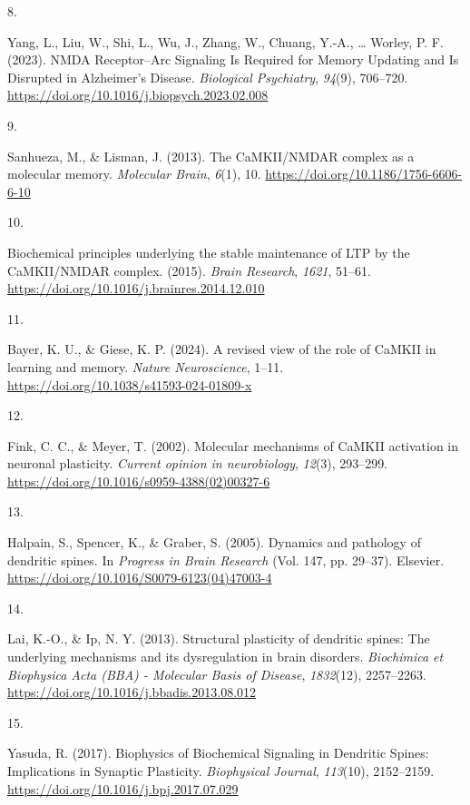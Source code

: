 \documentclass[
  11pt,
  letterpaper,
]{scrreprt}
\newlength{\cslhangindent}
\newlength{\csllabelwidth}
\newenvironment{CSLReferences}[2] %
 {\begin{list}{}{%
  \setlength{\itemindent}{0pt}
  \setlength{\leftmargin}{0pt}
  \setlength{\parsep}{0pt}
  \ifodd #1
   \setlength{\leftmargin}{\cslhangindent}
   \setlength{\itemindent}{-1\cslhangindent}
  \fi
  \setlength{\itemsep}{#2\baselineskip}}}
 {\end{list}}
\newcommand{\CSLLeftMargin}[1]{\parbox[t]{\csllabelwidth}{\strut#1\strut}}
\newcommand{\CSLRightInline}[1]{\parbox[t]{\linewidth - \csllabelwidth}{\strut#1\strut}}
\begin{document}
\begin{CSLReferences}{0}{0}
\CSLLeftMargin{8. }%
\CSLRightInline{Yang, L., Liu, W., Shi, L., Wu, J., Zhang, W., Chuang,
Y.-A., \ldots{} Worley, P. F. (2023). {NMDA Receptor}--{Arc Signaling Is
Required} for {Memory Updating} and {Is Disrupted} in {Alzheimer}'s
{Disease}. \emph{Biological Psychiatry}, \emph{94}(9), 706--720.
\url{https://doi.org/10.1016/j.biopsych.2023.02.008}}

\CSLLeftMargin{9. }%
\CSLRightInline{Sanhueza, M., \& Lisman, J. (2013). The {CaMKII}/{NMDAR}
complex as a molecular memory. \emph{Molecular Brain}, \emph{6}(1), 10.
\url{https://doi.org/10.1186/1756-6606-6-10}}

\CSLLeftMargin{10. }%
\CSLRightInline{Biochemical principles underlying the stable maintenance
of {LTP} by the {CaMKII}/{NMDAR} complex. (2015). \emph{Brain Research},
\emph{1621}, 51--61.
\url{https://doi.org/10.1016/j.brainres.2014.12.010}}

\CSLLeftMargin{11. }%
\CSLRightInline{Bayer, K. U., \& Giese, K. P. (2024). A revised view of
the role of {CaMKII} in learning and memory. \emph{Nature Neuroscience},
1--11. \url{https://doi.org/10.1038/s41593-024-01809-x}}

\CSLLeftMargin{12. }%
\CSLRightInline{Fink, C. C., \& Meyer, T. (2002). Molecular mechanisms
of {CaMKII} activation in neuronal plasticity. \emph{Current opinion in
neurobiology}, \emph{12}(3), 293--299.
\url{https://doi.org/10.1016/s0959-4388(02)00327-6}}

\CSLLeftMargin{13. }%
\CSLRightInline{Halpain, S., Spencer, K., \& Graber, S. (2005). Dynamics
and pathology of dendritic spines. In \emph{Progress in {Brain
Research}} (Vol. 147, pp. 29--37). Elsevier.
\url{https://doi.org/10.1016/S0079-6123(04)47003-4}}

\CSLLeftMargin{14. }%
\CSLRightInline{Lai, K.-O., \& Ip, N. Y. (2013). Structural plasticity
of dendritic spines: {The} underlying mechanisms and its dysregulation
in brain disorders. \emph{Biochimica et Biophysica Acta (BBA) -
Molecular Basis of Disease}, \emph{1832}(12), 2257--2263.
\url{https://doi.org/10.1016/j.bbadis.2013.08.012}}

\CSLLeftMargin{15. }%
\CSLRightInline{Yasuda, R. (2017). Biophysics of {Biochemical Signaling}
in {Dendritic Spines}: {Implications} in {Synaptic Plasticity}.
\emph{Biophysical Journal}, \emph{113}(10), 2152--2159.
\url{https://doi.org/10.1016/j.bpj.2017.07.029}}


\end{CSLReferences}
\end{document}
